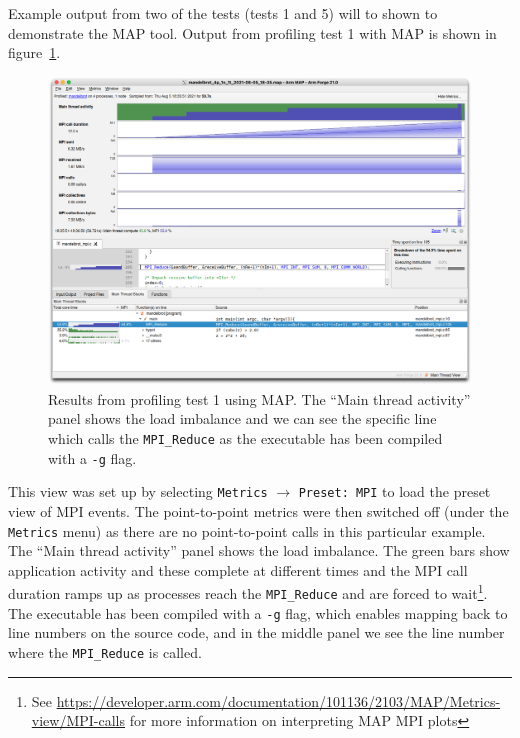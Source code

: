 \documentclass[a4paper,titlepage]{article}
\begin{document}
Example output from two of the tests (tests 1 and 5) will to shown to demonstrate the MAP tool. Output from profiling test 1 with MAP is shown in figure~\ref{fig:MAP_test1}.
%
\begin{figure}[htbp]
\begin{center}
\includegraphics[scale=0.3]{figures/MAP_test1}
\caption{Results from profiling test 1 using MAP. The ``Main thread activity'' panel shows the load imbalance and
we can see the specific line which calls the \texttt{MPI\_Reduce} as the executable has been compiled with a \texttt{-g} flag.}
\label{fig:MAP_test1}
\end{center}
\end{figure}
This view was set up by selecting \texttt{Metrics} $\rightarrow$ \texttt{Preset: MPI} to load the preset view of MPI events. The point-to-point metrics were then switched off (under the \texttt{Metrics} menu) as there are no point-to-point calls in this particular example. The ``Main thread activity'' panel shows the load imbalance. The green bars show application activity and these complete at different times and the MPI call duration ramps up as processes reach the \verb+MPI_Reduce+ and are forced to wait\footnote{See \url{https://developer.arm.com/documentation/101136/2103/MAP/Metrics-view/MPI-calls} for more information on interpreting MAP MPI plots}. The executable has been compiled with a \texttt{-g} flag, which enables mapping back to line numbers on the source code, and in the middle panel we see the line number where the \verb+MPI_Reduce+ is called. 
\end{document}
